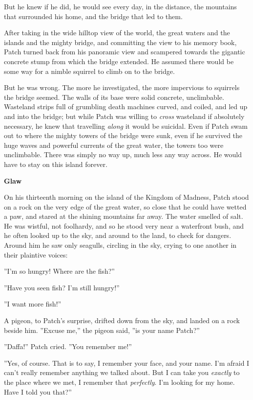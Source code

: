 \documentclass[11pt]{article}
\begin{document}
But he knew if he did, he would see every day, in the distance, the mountains that surrounded his home, and the bridge that led to them.\par
After taking in the wide hilltop view of the world, the great waters and the islands and the mighty bridge, and committing the view to his memory book, Patch turned back from his panoramic view and scampered towards the gigantic concrete stump from which the bridge extended. He assumed there would be some way for a nimble squirrel to climb on to the bridge.\par
 But he was wrong. The more he investigated, the more impervious to squirrels the bridge seemed. The walls of its base were solid concrete, unclimbable. Wasteland strips full of grumbling death machines curved, and coiled, and led up and into the bridge; but while Patch was willing to {\it cross} wasteland if absolutely necessary, he knew that travelling {\it along} it would be suicidal. Even if Patch swam out to where the mighty towers of the bridge were sunk, even if he survived the huge waves and powerful currents of the great water, the towers too were unclimbable. There was simply no way up, much less any way across. He would have to stay on this island forever.\par
\par
{\bf Glaw\par
}\par
 On his thirteenth morning on the island of the Kingdom of Madness, Patch stood on a rock on the very edge of the great water, so close that he could have wetted a paw, and stared at the shining mountains far away. The water smelled of salt. He was wistful, not foolhardy, and so he stood very near a waterfront bush, and he often looked up to the sky, and around to the land, to check for dangers. Around him he saw only seagulls, circling in the sky, crying to one another in their plaintive voices:\par
''I'm so hungry! Where are the fish?''\par
''Have you seen fish? I'm still hungry!''\par
''I want more fish!''\par
 A pigeon, to Patch's surprise, drifted down from the sky, and landed on a rock beside him. ''Excuse me,'' the pigeon said, ''is your name Patch?''\par
 ''Daffa!'' Patch cried. ''You remember me!''\par
 ''Yes, of course. That is to say, I remember your face, and your name. I'm afraid I can't really remember anything we talked about. But I can take you {\it exactly} to the place where we met, I remember that {\it perfectly}. I'm looking for my home. Have I told you that?''\par
\end{document}

